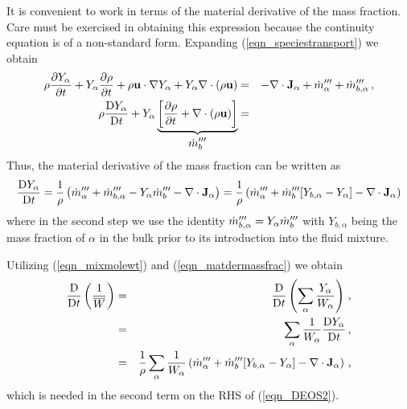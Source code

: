\documentclass[11pt]{book}
\begin{document}
It is convenient to work in terms of the material derivative of the mass fraction.  Care must be exercised in obtaining this expression because the continuity equation is of a non-standard form.
Expanding (\ref{eqn_speciestransport}) we obtain
\begin{eqnarray}
\label{eqn_speciesexpansion}
\rho\frac{\partial Y_\alpha}{\partial t} + Y_\alpha \frac{\partial \rho}{\partial t} + \rho \mathbf{u}\cdot \nabla Y_\alpha + Y_\alpha \Div \left(\rho \mathbf{u}\right) &=&
- \Div \mathbf{J}_{\alpha} + \dot{m}_\alpha^{\tripleprime} + \dot{m}_{b,\alpha}^{\tripleprime} \,\mbox{,} \nonumber\vspace{0.3cm}\\
\rho \frac{\mbox{D} Y_\alpha}{\mbox{D} t} + Y_\alpha \underbrace{\left[ \frac{\partial \rho}{\partial t} + \Div \left(\rho \mathbf{u}\right) \right]}_{\displaystyle \dot{m}_b^{\tripleprime}} &=& \mbox{}
\end{eqnarray}
Thus, the material derivative of the mass fraction can be written as
\begin{equation}
\label{eqn_matdermassfrac}
\frac{\mbox{D} Y_\alpha}{\mbox{D} t} = \frac{1}{\rho}\left(  \dot{m}_\alpha^{{\prime\prime\prime}} + \dot{m}_{b,\alpha}^{{\prime\prime\prime}} -
Y_\alpha \dot{m}_b^{{\prime\prime\prime}}  - \nabla\cdot \mathbf{J}_{\alpha} \right)
= \frac{1}{\rho}\left(  \dot{m}_\alpha^{{\prime\prime\prime}} + \dot{m}_{b}^{{\prime\prime\prime}}[Y_{b,\alpha} - Y_\alpha] - \nabla\cdot \mathbf{J}_{\alpha} \right)
\end{equation}
where in the second step we use the identity $\dot{m}_{b,\alpha}^{{\prime\prime\prime}} = Y_\alpha \dot{m}_{b}^{{\prime\prime\prime}}$ with $Y_{b,\alpha}$ being the
mass fraction of $\alpha$ in the bulk prior to its introduction into the fluid mixture.

Utilizing (\ref{eqn_mixmolewt}) and (\ref{eqn_matdermassfrac}) we obtain
\begin{eqnarray}
\label{eqn_transportexpression}
\frac{\mbox{D}}{\mbox{D} t}\left(\frac{1}{\overline{W}}\right) &=& \frac{\mbox{D}}{\mbox{D} t}\left(\sum_\alpha \frac{Y_\alpha}{W_\alpha} \right) \,\mbox{,} \nonumber \vspace{0.3cm}\\
&=& \sum_\alpha \frac{1}{W_\alpha} \frac{\mbox{D}Y_\alpha }{\mbox{D} t} \,\mbox{,} \nonumber \vspace{0.3cm}\\
&=& \frac{1}{\rho} \sum_\alpha \frac{1}{W_\alpha} \left(  \dot{m}_\alpha^{\tripleprime} + \dot{m}_{b}^{\tripleprime}[Y_{b,\alpha} - Y_\alpha] - \Div \mathbf{J}_{\alpha} \right)  \,\mbox{,}
\end{eqnarray}
which is needed in the second term on the RHS of (\ref{eqn_DEOS2}).
\end{document}
